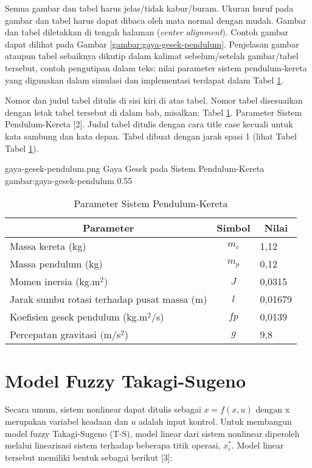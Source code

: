 Semua gambar dan tabel harus jelas/tidak kabur/buram. Ukuran huruf pada gambar dan tabel harus dapat dibaca oleh mata normal dengan mudah. Gambar dan tabel diletakkan di tengah halaman (\emph{center alignment}). Contoh gambar dapat dilihat pada Gambar \ref{gambar:gaya-gesek-pendulum}. Penjelasan gambar ataupun tabel sebaiknya dikutip dalam kalimat sebelum/setelah gambar/tabel tersebut, contoh pengutipan dalam teks: nilai parameter sistem pendulum-kereta yang digunakan dalam simulasi dan implementasi terdapat dalam Tabel \ref{tabel:pendulum}.

Nomor dan judul tabel ditulis di sisi kiri di atas tabel. Nomor tabel disesuaikan dengan letak tabel tersebut di dalam bab, misalkan: Tabel \ref{tabel:pendulum}. Parameter Sistem Pendulum-Kereta [2]. Judul tabel ditulis dengan cara title case kecuali untuk kata sambung dan kata depan. Tabel dibuat dengan jarak spasi 1 (lihat  Tabel Tabel \ref{tabel:pendulum}).

\gambar
    {gaya-gesek-pendulum.png}
    {Gaya Gesek pada Sistem Pendulum-Kereta}
    {gambar:gaya-gesek-pendulum}
    {0.55}
   
\begin{table}
    \caption{Parameter Sistem Pendulum-Kereta}
    \centering
    \begin{tabular}{ lcl } 
        \toprule
        \multicolumn{1}{c}{\textbf{Parameter}} & \multicolumn{1}{c}{\textbf{Simbol}} & \multicolumn{1}{c}{\textbf{Nilai}} \\
        \midrule
        Massa kereta (kg) & $m_c$ & 1,12 \\
        Massa pendulum (kg) & $m_p$ & 0,12 \\
        Momen inersia (kg.m$^2$) & $J$ & 0,0315 \\
        Jarak sumbu rotasi terhadap pusat massa (m) & $l$ & 0,01679 \\
        Koefisien gesek pendulum (kg.m$^2$/s) & $fp$ & 0,0139 \\
        Percepatan gravitasi (m/s$^2$) & $g$ & 9,8 \\
        \bottomrule
    \end{tabular}
    \label{tabel:pendulum}
\end{table}

\section{Model Fuzzy Takagi-Sugeno}

Secara umum, sistem nonlinear dapat ditulis sebagai $x = f(x,u)$  dengan x merupakan variabel keadaan dan $u$ adalah input kontrol. Untuk membangun model fuzzy Takagi-Sugeno (T-S), model linear dari sistem nonlinear diperoleh melalui linearisasi sistem terhadap beberapa titik operasi, $x_i^*$. Model linear tersebut memiliki bentuk sebagai berikut [3]:

